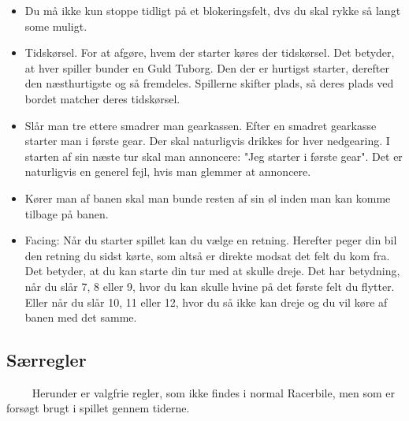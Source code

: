 \documentclass[12pt]{article}
\begin{document}
\begin{itemize}

\item Du må ikke kun stoppe tidligt på et blokeringsfelt, dvs du skal rykke så langt some muligt.
 
\item Tidskørsel. For at afgøre, hvem der starter køres der tidskørsel. Det betyder, at hver spiller bunder en Guld Tuborg. Den der er hurtigst starter, derefter den næsthurtigste og så fremdeles. Spillerne skifter plads, så deres plads ved bordet matcher deres tidskørsel.

\item Slår man tre ettere smadrer man gearkassen. Efter en smadret gearkasse starter man i første gear. Der skal naturligvis drikkes for hver nedgearing. I starten af sin næste tur skal man annoncere: "Jeg starter i første gear". Det er naturligvis en generel fejl, hvis man glemmer at annoncere. %

\item Kører man af banen skal man bunde resten af sin øl inden man kan komme tilbage på banen.

\item Facing: Når du starter spillet kan du vælge en retning. Herefter peger din bil den retning du sidst kørte, som altså er direkte modsat det felt du kom fra. Det betyder, at du kan starte din tur med at skulle dreje. Det har betydning, når du slår 7, 8 eller 9, hvor du kan skulle hvine på det første felt du flytter. Eller når du slår 10, 11 eller 12, hvor du så ikke kan dreje og du vil køre af banen med det samme.

\end{itemize}

\subsection*{Særregler}

$\qquad$ Herunder er valgfrie regler, som ikke findes i normal Racerbile, men som er forsøgt brugt i spillet gennem tiderne.
\end{document}

